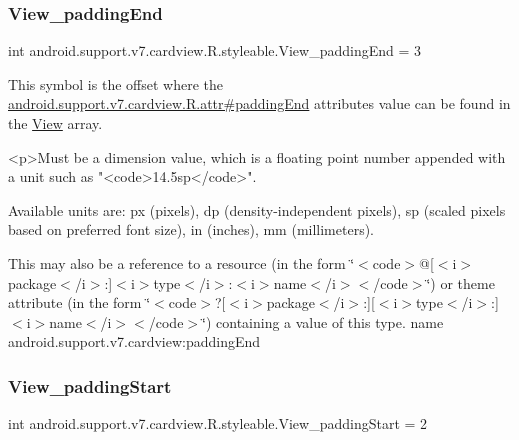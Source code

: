 \subsubsection{\texorpdfstring{View\+\_\+padding\+End}{View\_paddingEnd}}
{\footnotesize\ttfamily int android.\+support.\+v7.\+cardview.\+R.\+styleable.\+View\+\_\+padding\+End = 3\hspace{0.3cm}{\ttfamily [static]}}

This symbol is the offset where the \hyperlink{classandroid_1_1support_1_1v7_1_1cardview_1_1R_1_1attr_a07d1a86cd095b0bb58de34c228cbd699}{android.\+support.\+v7.\+cardview.\+R.\+attr\#padding\+End} attribute\textquotesingle{}s value can be found in the \hyperlink{classandroid_1_1support_1_1v7_1_1cardview_1_1R_1_1styleable_a25c91e78e53c1aa0141b94584e88b486}{View} array.

\begin{DoxyVerb}      <p>Must be a dimension value, which is a floating point number appended with a unit such as "<code>14.5sp</code>".
\end{DoxyVerb}
 Available units are\+: px (pixels), dp (density-\/independent pixels), sp (scaled pixels based on preferred font size), in (inches), mm (millimeters). 

This may also be a reference to a resource (in the form \char`\"{}$<$code$>$@\mbox{[}$<$i$>$package$<$/i$>$\+:\mbox{]}$<$i$>$type$<$/i$>$\+:$<$i$>$name$<$/i$>$$<$/code$>$\char`\"{}) or theme attribute (in the form \char`\"{}$<$code$>$?\mbox{[}$<$i$>$package$<$/i$>$\+:\mbox{]}\mbox{[}$<$i$>$type$<$/i$>$\+:\mbox{]}$<$i$>$name$<$/i$>$$<$/code$>$\char`\"{}) containing a value of this type.  name android.\+support.\+v7.\+cardview\+:padding\+End \mbox{\label{classandroid_1_1support_1_1v7_1_1cardview_1_1R_1_1styleable_af3ab4c9945e99c8800d0a26c042be3e5}} 
\subsubsection{\texorpdfstring{View\+\_\+padding\+Start}{View\_paddingStart}}
{\footnotesize\ttfamily int android.\+support.\+v7.\+cardview.\+R.\+styleable.\+View\+\_\+padding\+Start = 2\hspace{0.3cm}{\ttfamily [static]}}

